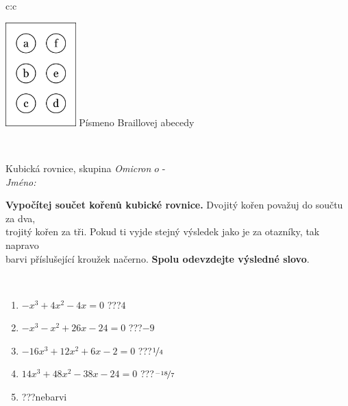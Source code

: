 \documentclass[10pt]{report}
\newcommand\omicron{o}
\begin{document}
\begin{tabular}{c:c}
\begin{minipage}[c][104.5mm][t]{0.5\linewidth}
\begin{center}
\begin{minipage}{0.20\linewidth}
\begin{center}
\includegraphics[height=40mm]{../images/braille.png}
{\small Písmeno Braillovej abecedy}
\end{center}
\end{minipage}
\end{center}
\end{minipage}
\\ \hdashline
\begin{minipage}[c][104.5mm][t]{0.5\linewidth}
\begin{center}
\vspace{7mm}
{\huge Kubická rovnice, skupina \textit{Omicron $\omicron$} -}\\[5mm]
\textit{Jméno:}\phantom{xxxxxxxxxxxxxxxxxxxxxxxxxxxxxxxxxxxxxxxxxxxxxxxxxxxxxxxxxxxxxxxxx}\\[5mm]
\begin{minipage}{0.95\linewidth}
\begin{center}
\textbf{Vypočítej součet kořenů kubické rovnice.} Dvojitý kořen považuj do součtu za dva,\\trojitý kořen za tři. Pokud ti vyjde stejný výsledek jako je za otazníky, tak napravo\\barvi příslušející kroužek načerno. \textbf{Spolu odevzdejte výsledné slovo}.
\end{center}
\end{minipage}
\\[1mm]
\begin{minipage}{0.79\linewidth}
\begin{center}
\begin{varwidth}{\linewidth}
\begin{enumerate}
\Large
\item $-x^3+4x^2-4x=0$\quad \dotfill\; ???\;\dotfill \quad $4$
\item $-x^3-x^2+26x-24=0$\quad \dotfill\; ???\;\dotfill \quad $-9$
\item $-16x^3+12x^2+6x-2=0$\quad \dotfill\; ???\;\dotfill \quad $\nicefrac{1}{4}$
\item $14x^3+48x^2-38x-24=0$\quad \dotfill\; ???\;\dotfill \quad $\nicefrac{-18}{7}$
\item \quad \dotfill\; ???\;\dotfill \quad nebarvi

\end{enumerate}
\end{varwidth}
\end{center}
\end{minipage}
\end{center}
\end{minipage}
\end{tabular}
\end{document}

